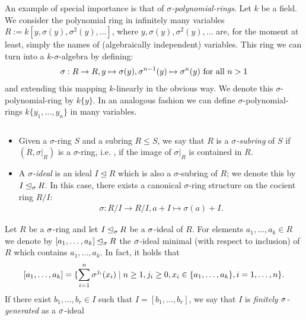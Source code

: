 \begin{ex}
An example of special importance is that of $\sigma$\emph{-polynomial-rings}. 
Let $k$ be a field. We consider the polynomial ring in infinitely many variables $R:= k[y,\sigma(y),\sigma^2(y),\ldots]$,
 where $y,\sigma(y),\sigma^2(y),\ldots$ are, for the moment at least, simply the names of (algebraically independent) variables.
This ring we can turn into a $k$-$\sigma$-algebra by defining:
\begin{align*} 
\sigma:  R \rightarrow R, y \mapsto \sigma(y), \sigma^{n-1}(y) \mapsto \sigma^{n}(y) \text{ for all } n > 1 
\end{align*}
and extending this mapping $k$-linearly in the obvious way. We denote this $\sigma$-polynomial-ring by $k\{y\}$. In an analogous fashion we can define $\sigma$-polynomial-rings $k\{y_1, \ldots, y_n \}$ in many variables. 
\end{ex}

\begin{defn} $\phantom{}$
\begin{itemize}
\item Given a $\sigma$-ring $S$ and a subring $R \leq S$, we say that $R$ is a $\sigma$\emph{-subring}  of $S$ if $(R,\sigma|_{R})$ is a $\sigma$-ring,
i.e. , if the image of $\sigma|_{R}$ is contained in $R$.
\item A $\sigma$\emph{-ideal}  is an ideal $I \unlhd R$ which is also a $\sigma$-subring of $R$; we denote this by $I \unlhd_{\sigma} R$. In this case, there exists a canonical $\sigma$-ring structure on the cocient ring $R/I$:
\begin{align*} \sigma: R/I \rightarrow R/I, a + I \mapsto \sigma(a) + I. \end{align*}
\end{itemize}
\end{defn}

\begin{defn}
Let $R$ be a $\sigma$-ring and let  $I \unlhd_{\sigma} R$ be a $\sigma$-ideal of $R$. For elements $a_1, \ldots, a_k \in R$ we denote by $[a_1, \ldots, a_k] \unlhd_{\sigma} R$ the $\sigma$-ideal minimal (with respect to inclusion) of $R$ which contains $a_1,\ldots,a_k$. 
In fact, it holds that \[[a_1,\ldots,a_k] = \{ \sum_{i=1}^n \sigma^{j_i}(x_i) \mid n \geq 1, j_i \geq 0, x_i \in \{a_1,\ldots,a_k\}, i=1,\ldots,n \}. \] If there exist $b_1,\ldots,b_r \in I$ such that $I = [b_1,\ldots,b_r]$,
 we say that $I$ is \emph{finitely $\sigma$-generated} as a $\sigma$-ideal 
\end{defn}

